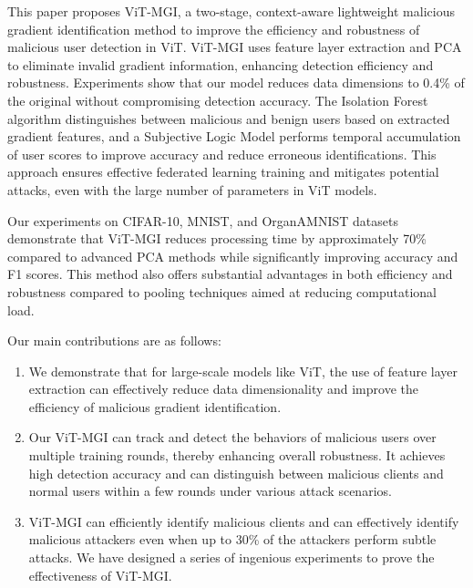 \documentclass[conference]{IEEEtran}
\begin{document}
This paper proposes ViT-MGI, a two-stage, context-aware lightweight malicious gradient identification method to improve the efficiency and robustness of malicious user detection in ViT. ViT-MGI uses feature layer extraction and PCA to eliminate invalid gradient information, enhancing detection efficiency and robustness. Experiments show that our model reduces data dimensions to 0.4\% of the original without compromising detection accuracy. The Isolation Forest algorithm distinguishes between malicious and benign users based on extracted gradient features, and a Subjective Logic Model performs temporal accumulation of user scores to improve accuracy and reduce erroneous identifications. This approach ensures effective federated learning training and mitigates potential attacks, even with the large number of parameters in ViT models.

Our experiments on CIFAR-10, MNIST, and OrganAMNIST datasets demonstrate that ViT-MGI reduces processing time by approximately 70\% compared to advanced PCA methods while significantly improving accuracy and F1 scores. This method also offers substantial advantages in both efficiency and robustness compared to pooling techniques aimed at reducing computational load.

Our main contributions are as follows:


\begin{enumerate}
    \item We demonstrate that for large-scale models like ViT, the use of feature layer extraction can effectively reduce data dimensionality and improve the efficiency of malicious gradient identification.
    \item Our ViT-MGI can track and detect the behaviors of malicious users over multiple training rounds, thereby enhancing overall robustness. It achieves high detection accuracy and can distinguish between malicious clients and normal users within a few rounds under various attack scenarios.
    \item ViT-MGI can efficiently identify malicious clients and can effectively identify malicious attackers even when up to 30\% of the attackers perform subtle attacks. We have designed a series of ingenious experiments to prove the effectiveness of ViT-MGI.
\end{enumerate}
\end{document}
